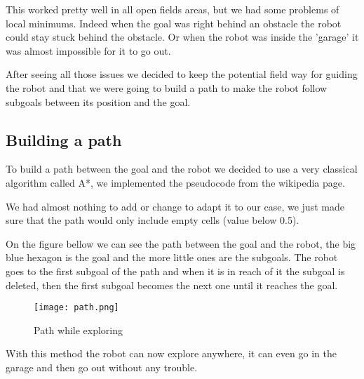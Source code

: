 This worked pretty well in all open fields areas, but we had some problems of local minimums.
Indeed when the goal was right behind an obstacle the robot could stay stuck behind the obstacle.
Or when the robot was inside the 'garage' it was almost impossible for it to go out.

After seeing all those issues we decided to keep the potential field way for guiding the robot and that we were going to build a path to make the robot follow subgoals between its position and the goal.

\subsection{Building a path}

To build a path between the goal and the robot we decided to use a very classical algorithm called A*, we implemented the pseudocode from the wikipedia page\cite{astar}.

We had almost nothing to add or change to adapt it to our case, we just made sure that the path would only include empty cells (value below 0.5).

On the figure bellow we can see the path between the goal and the robot, the big blue hexagon is the goal and the more little ones are the subgoals.
The robot goes to the first subgoal of the path and when it is in reach of it the subgoal is deleted, then the first subgoal becomes the next one until it reaches the goal.

\begin{figure}[h]
    \centering\texttt{[image: path.png]}
    \label{fig:path}
    \caption{Path while exploring}
\end{figure}

With this method the robot can now explore anywhere, it can even go in the garage and then go out without any trouble.
